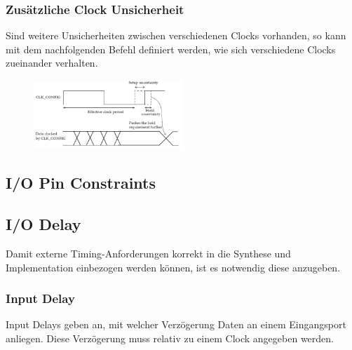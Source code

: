 \begin{multicols}{2}
    \subsubsection{Zusätzliche Clock Unsicherheit}
    Sind weitere Unsicherheiten zwischen verschiedenen Clocks vorhanden, so kann mit dem nachfolgenden Befehl definiert werden, wie sich verschiedene Clocks zueinander verhalten.
    
    \begin{figure}[H]
        \includegraphics[width=0.5\textwidth]{images/clock_uncertainty.png}
    \end{figure}
\end{multicols}

\subsection{I/O Pin Constraints}


\subsection{I/O Delay}
Damit externe Timing-Anforderungen korrekt in die Synthese und Implementation einbezogen werden können, ist es notwendig diese anzugeben.

\subsubsection{Input Delay} \label{chapter:input_delay}
Input Delays geben an, mit welcher Verzögerung Daten an einem Eingangsport anliegen. Diese Verzögerung muss relativ zu einem Clock angegeben werden.

